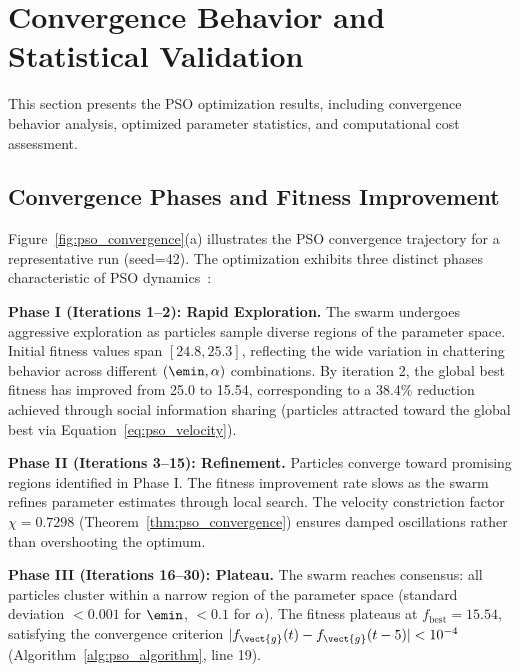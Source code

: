 \section{Convergence Behavior and Statistical Validation}
\label{sec:convergence_results}

This section presents the PSO optimization results, including convergence behavior analysis, optimized parameter statistics, and computational cost assessment.

\subsection{Convergence Phases and Fitness Improvement}
\label{subsec:convergence_behavior}

Figure~\ref{fig:pso_convergence}(a) illustrates the PSO convergence trajectory for a representative run (seed=42). The optimization exhibits three distinct phases characteristic of PSO dynamics~\cite{eberhart2001swarm}:

\textbf{Phase I (Iterations 1--2): Rapid Exploration.} The swarm undergoes aggressive exploration as particles sample diverse regions of the parameter space. Initial fitness values span $[24.8, 25.3]$, reflecting the wide variation in chattering behavior across different $(\emin, \alpha)$ combinations. By iteration 2, the global best fitness has improved from 25.0 to 15.54, corresponding to a 38.4\% reduction achieved through social information sharing (particles attracted toward the global best via Equation~\ref{eq:pso_velocity}).

\textbf{Phase II (Iterations 3--15): Refinement.} Particles converge toward promising regions identified in Phase I. The fitness improvement rate slows as the swarm refines parameter estimates through local search. The velocity constriction factor $\chi = 0.7298$ (Theorem~\ref{thm:pso_convergence}) ensures damped oscillations rather than overshooting the optimum.

\textbf{Phase III (Iterations 16--30): Plateau.} The swarm reaches consensus: all particles cluster within a narrow region of the parameter space (standard deviation $< 0.001$ for $\emin$, $< 0.1$ for $\alpha$). The fitness plateaus at $f_{\text{best}} = 15.54$, satisfying the convergence criterion $|f_{\vect{g}}(t) - f_{\vect{g}}(t-5)| < 10^{-4}$ (Algorithm~\ref{alg:pso_algorithm}, line 19).

